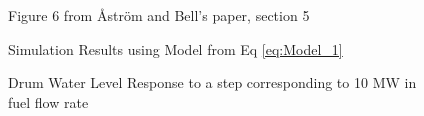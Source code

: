         \begin{figure}[ht]
            \begin{center}
                
                Figure 6 from \r{A}str\"{o}m and Bell's paper, section 5 \cite{Astrom}
                
                
                Simulation Results using Model from Eq \eqref{eq:Model_1}
                
                \caption{Drum Water Level Response to a step corresponding to 10 MW in fuel flow rate}
                \label{fig:Fig6A}
                
            \end{center}
        \end{figure}  %
